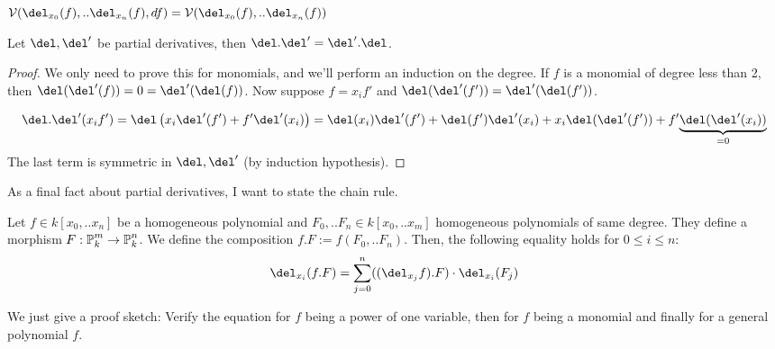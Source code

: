 \begin{corollary}
$\V(\del_{x_0}(f),..\del_{x_n}(f), df) = \V(\del_{x_0}(f),..\del_{x_n}(f))$
\end{corollary}

\begin{lemma} \label{lemmaPartialDerivativesCommute}
Let $\del,\del'$ be partial derivatives, then $\del.\del' = \del'.\del$.
\end{lemma}
\begin{proof}
We only need to prove this for monomials, and we'll perform an induction on the degree.
If $f$ is a monomial of degree less than 2, then $\del(\del'(f)) = 0 = \del'(\del(f))$. 
Now suppose $f = x_if'$ and $\del(\del'(f')) = \del'(\del(f'))$.

\begin{equation}
\del.\del'(x_if') = \del\left(x_i\del'(f') + f'\del'(x_i)\right) = 
\del(x_i)\del'(f') + \del(f')\del'(x_i) + x_i\del(\del'(f')) + f'\underset{=0}{\underbrace{\del(\del'(x_i))}}
\end{equation}
The last term is symmetric in $\del,\del'$ (by induction hypothesis).
\end{proof}

As a final fact about partial derivatives, I want to state the chain rule.
\begin{lemma}
Let $f \in k[x_0,..x_n]$ be a homogeneous polynomial and $F_0,..F_n \in k[x_0,..x_m]$ homogeneous polynomials of same degree.
They define a morphism $F : \operatorname{\mathbb P}^m_k \to \operatorname{\mathbb P}^n_k$.
We define the composition $f.F := f(F_0,..F_n)$.
Then, the following equality holds for $0 \leq i \leq n$:
\begin{equation}
\del_{x_i} (f.F) = \sum_{j=0}^n ((\del_{x_j}f).F) \cdot \del_{x_i}(F_j)
\end{equation}
\end{lemma}
We just give a proof sketch: Verify the equation for $f$ being a power of one variable, then for $f$ being a monomial and finally for a general polynomial $f$. \hfill\qedsymbol

